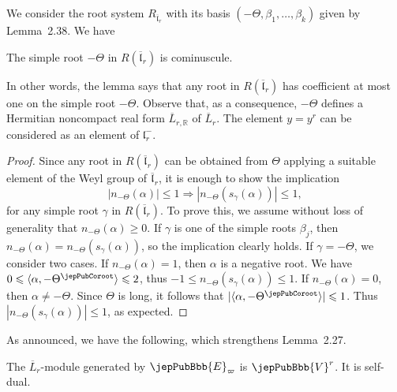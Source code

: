 We consider the root system $R_{\overline{\mathfrak l}_r}$ with its basis $(-\Theta,\beta_1,\ldots,\beta_k)$ given by Lemma~2.38. We have
\begin{lemma}
The simple root $-\Theta$ in $R(\overline{\mathfrak l}_r)$ is cominuscule.
\end{lemma}
In other words, the lemma says that any root in $R(\overline{\mathfrak l}_r)$ has coefficient at most one on the simple root $-\Theta$. Observe that, as a consequence, $-\Theta$ defines a Hermitian noncompact real form $\overline L_{r,\mathbb R}$ of $\overline L_r$. The element $y=y^r$ can be considered as an element of $\mathfrak l_r^-$.
\begin{proof}
Since any root in $R(\overline{\mathfrak l}_r)$ can be obtained from $\Theta$ applying a suitable element of the Weyl group of $\overline{\mathfrak l}_r$, it is enough to show the implication
\[
|n_{-\Theta}(\alpha)|\leqslant1\Longrightarrow|n_{-\Theta}(s_\gamma(\alpha))|\leqslant1,
\]
for any simple root $\gamma$ in $R(\overline{\mathfrak l}_r)$. To prove this, we assume without loss of generality that $n_{-\Theta}(\alpha)\geqslant0$. If $\gamma$ is one of the simple roots $\beta_j$, then $n_{-\Theta}(\alpha)=n_{-\Theta}(s_\gamma(\alpha))$, so the implication clearly holds. If $\gamma=-\Theta$, we consider two cases. If $n_{-\Theta}(\alpha)=1$, then $\alpha$ is a negative root. We have $0\leqslant\langle\alpha,-\Theta^\jepPubCoroot\rangle\leqslant2$, thus $-1\leqslant n_{-\Theta}(s_\gamma(\alpha))\leqslant1$. If $n_{-\Theta}(\alpha)=0$, then $\alpha\neq-\Theta$. Since $\Theta$ is long, it follows that $|\langle\alpha,-\Theta^\jepPubCoroot\rangle|\leqslant1$. Thus $|n_{-\Theta}(s_\gamma(\alpha))|\leqslant1$, as expected.
\end{proof}
As announced, we have the following, which strengthens Lemma~2.27.
\begin{proposition}
The $\overline L_r$-module generated by $\jepPubBbb{E}_\varpi$ is $\jepPubBbb{V}^r$. It is self-dual.
\end{proposition}
